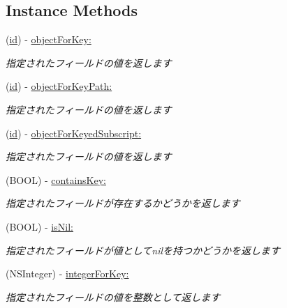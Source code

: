 \subsection*{Instance Methods}
\begin{DoxyCompactItemize}
\item 
(\hyperlink{interface_b_d_object_aa753599ab0726dcd36d8a3abd37281e2}{id}) -\/ \hyperlink{interface_b_d_object_a8704a73eaae09583a9759b0ced5e5b2e}{object\-For\-Key\-:}
\begin{DoxyCompactList}\small\item\em 指定されたフィールドの値を返します \end{DoxyCompactList}\item 
(\hyperlink{interface_b_d_object_aa753599ab0726dcd36d8a3abd37281e2}{id}) -\/ \hyperlink{interface_b_d_object_a5b4783305f8f4d7fe3aebd1f895873ff}{object\-For\-Key\-Path\-:}
\begin{DoxyCompactList}\small\item\em 指定されたフィールドの値を返します \end{DoxyCompactList}\item 
(\hyperlink{interface_b_d_object_aa753599ab0726dcd36d8a3abd37281e2}{id}) -\/ \hyperlink{interface_b_d_object_a9f5efc9082f7c8b81e6acac472351668}{object\-For\-Keyed\-Subscript\-:}
\begin{DoxyCompactList}\small\item\em 指定されたフィールドの値を返します \end{DoxyCompactList}\item 
(B\-O\-O\-L) -\/ \hyperlink{interface_b_d_object_a044aa33059d62c53333fa53d205de5c0}{contains\-Key\-:}
\begin{DoxyCompactList}\small\item\em 指定されたフィールドが存在するかどうかを返します \end{DoxyCompactList}\item 
(B\-O\-O\-L) -\/ \hyperlink{interface_b_d_object_aae51c35890852ab7c55859d1f5fd2bf1}{is\-Nil\-:}
\begin{DoxyCompactList}\small\item\em 指定されたフィールドが値としてnilを持つかどうかを返します \end{DoxyCompactList}\item 
(N\-S\-Integer) -\/ \hyperlink{interface_b_d_object_a158d8a6721f99c4830c29c36e4f21ae4}{integer\-For\-Key\-:}
\begin{DoxyCompactList}\small\item\em 指定されたフィールドの値を整数として返します \end{DoxyCompactList}\item 

\end{DoxyCompactItemize}

